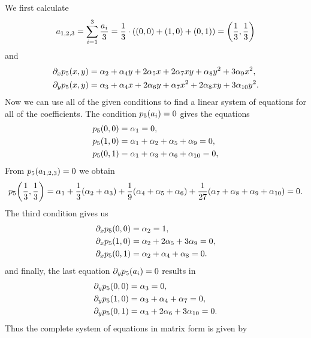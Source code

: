 \documentclass[english]{exercise}
\begin{document}
    We first calculate
    \[
        a_{1, 2, 3} = \sum_{i = 1}^3 \frac{a_i}{3} = \frac{1}{3} \cdot \parentheses*{\parentheses*{0, 0} + \parentheses*{1, 0} + \parentheses*{0, 1}} = \parentheses*{\frac{1}{3}, \frac{1}{3}}
    \]
    and
    \begin{align*}
        \partial_x p_5\parentheses*{x, y} &= \alpha_2 + \alpha_4 y + 2\alpha_5 x + 2\alpha_7 xy + \alpha_8 y^2 + 3\alpha_9 x^2,\\
        \partial_y p_5\parentheses*{x, y} &= \alpha_3 + \alpha_4 x + 2\alpha_6 y + \alpha_7 x^2 + 2\alpha_8 xy + 3\alpha_{10}y^2.
    \end{align*}
    Now we can use all of the given conditions to find a linear system of equations for all of the coefficients.
    The condition \(p_5\parentheses*{a_i} = 0\) gives the equations
    \begin{align*}
        p_5\parentheses*{0, 0} &= \alpha_1 = 0,\\
        p_5\parentheses*{1, 0} &= \alpha_1 + \alpha_2 + \alpha_5 + \alpha_9 = 0,\\
        p_5\parentheses*{0, 1} &= \alpha_1 + \alpha_3 + \alpha_6 + \alpha_{10} = 0,\\
    \end{align*}
    From \(p_5\parentheses*{a_{1, 2, 3}} = 0\) we obtain
    \[
        p_5\parentheses*{\frac{1}{3}, \frac{1}{3}} = \alpha_1 + \frac{1}{3}\parentheses*{\alpha_2 + \alpha_3} + \frac{1}{9}\parentheses*{\alpha_4 + \alpha_5 + \alpha_6} + \frac{1}{27}\parentheses*{\alpha_7 + \alpha_8 + \alpha_9 + \alpha_{10}} = 0.
    \]
    The third condition gives us
    \begin{align*}
        \partial_x p_5\parentheses*{0, 0} &= \alpha_2 = 1,\\
        \partial_x p_5\parentheses*{1, 0} &= \alpha_2 + 2\alpha_5 + 3\alpha_9 = 0,\\
        \partial_x p_5\parentheses*{0, 1} &= \alpha_2 + \alpha_4 + \alpha_8 = 0.
    \end{align*}
    and finally, the last equation \(\partial_y p_5\parentheses*{a_i} = 0\) results in
    \begin{align*}
        \partial_y p_5\parentheses*{0, 0} &= \alpha_3 = 0,\\
        \partial_y p_5\parentheses*{1, 0} &= \alpha_3 + \alpha_4 + \alpha_7 = 0,\\
        \partial_y p_5\parentheses*{0, 1} &= \alpha_3 + 2\alpha_6 + 3\alpha_{10} = 0.
    \end{align*}
    Thus the complete system of equations in matrix form is given by
\end{document}
